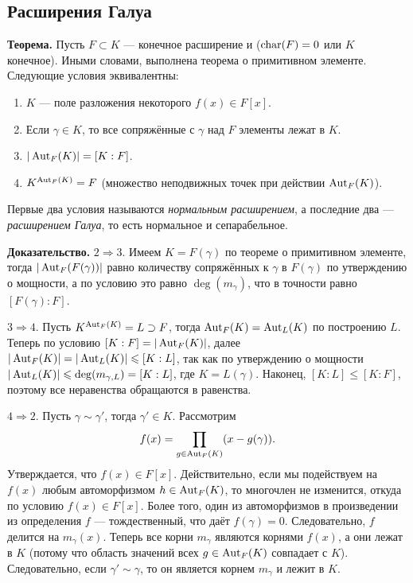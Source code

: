 \subsection{Расширения Галуа}
\textbf{Теорема.} Пусть $F \subset K$ --- конечное расширение и ($\operatorname{char}(F) = 0$ или $K$ конечное).
Иными словами, выполнена теорема о примитивном элементе.
Следующие условия эквивалентны:
\begin{enumerate}
    \item $K$ --- поле разложения некоторого $f(x) \in F[x]$.
    \item Если $\gamma \in K$, то все сопряжённые с $\gamma$ над $F$ элементы лежат в $K$.
    \item $|\operatorname{Aut}_F(K)| = [K:F]$.
    \item $K^{\operatorname{Aut}_F(K)} = F$ (множество неподвижных точек при действии $\operatorname{Aut}_F(K)$).
\end{enumerate}
Первые два условия называются \textit{нормальным расширением}, а последние два --- \textit{расширением Галуа}, то есть нормальное и сепарабельное.

\textbf{Доказательство.} $2 \Rightarrow 3$. Имеем $K = F(\gamma)$ по теореме о примитивном элементе, тогда $|\operatorname{Aut}_F(F(\gamma))|$ равно количеству сопряжённых к $\gamma$ в $F(\gamma)$ по утверждению о мощности, а по условию это равно $\deg(m_\gamma)$, что в точности равно $[F(\gamma) : F]$.

$3 \Rightarrow 4$. Пусть $K^{\operatorname{Aut}_F(K)} = L \supset F$, тогда $\operatorname{Aut}_F(K) = \operatorname{Aut}_L(K)$ по построению $L$.
Теперь по условию $[K : F] = |\operatorname{Aut}_F(K)|$, далее $|\operatorname{Aut}_F(K)| = |\operatorname{Aut}_L(K)| \leqslant [K : L]$, так как по утверждению о мощности $|\operatorname{Aut}_L(K)| \leqslant \deg(m_{\gamma, L}) = [K : L]$, где $K = L(\gamma)$.
Наконец, $[K : L] \le [K : F]$, поэтому все неравенства обращаются в равенства.

$4 \Rightarrow 2$. Пусть $\gamma \sim \gamma'$, тогда $\gamma' \in K$.
Рассмотрим
\[
    f(x) = \prod_{g \in \operatorname{Aut}_F(K)} (x - g(\gamma)).
\]
Утверждается, что $f(x) \in F[x]$.
Действительно, если мы подействуем на $f(x)$ любым автоморфизмом $h \in \operatorname{Aut}_F(K)$, то многочлен не изменится, откуда по условию $f(x) \in F[x]$.
Более того, один из автоморфизмов в произведении из определения $f$ --- тождественный, что даёт $f(\gamma) = 0$.
Следовательно, $f$ делится на $m_{\gamma}(x)$. Теперь все корни $m_{\gamma}$ являются корнями $f(x)$, а они лежат в $K$ (потому что область значений всех $g \in \operatorname{Aut}_F(K)$ совпадает с $K$).
Следовательно, если $\gamma' \sim \gamma$, то он является корнем $m_{\gamma}$ и лежит в $K$.

